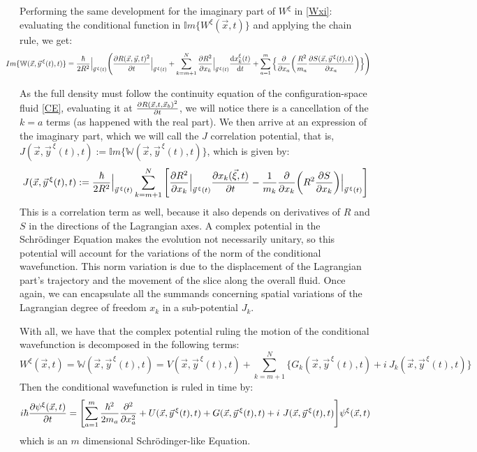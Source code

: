 \documentclass[11pt, a4paper]{article} %
\newcommand{\W}{\mathbb{W}}
\begin{document}
Performing the same development for the imaginary part of $W^\xi$ in \eqref{Wxi}: evaluating the conditional function in $\mathbb{I}m\{W^\xi(\vec{x},t)\}$ and applying the chain rule, we get:
\begin{equation}
\hspace{-0.7cm}Im\{\W(\vec{x}, \vec{y}^{\, \xi}(t),t)\}=\frac{\hbar}{2R^2}\Big\rvert_{\vec{y}^{\, \xi}(t)} \qty( \pdv{R(\vec{x},\vec{y},t)^2}{t}\Big\rvert_{\vec{y}^{\, \xi}(t)} + \sum_{k=m+1}^N \pdv{R^2}{x_k}\Big\rvert_{\vec{y}^{\, \xi}(t)} \dv{x_k^\xi(t)}{t} + \sum_{a=1}^m\Big\{\pdv{}{x_a} \qty(\frac{R^2}{m_a} \pdv{S(\vec{x}, \vec{y}^{\, \xi}(t),t)}{x_a} ) \Big\})
\end{equation}

As the full density must follow the continuity equation of the configuration-space fluid \eqref{CE}, evaluating it at $\pdv{R(\vec{x},t, \vec{x}_b)^2}{t}$, we will notice there is a cancellation of the $k=a$ terms (as happened with the real part). We then arrive at an expression of the imaginary part, which we will call the $J$ correlation potential, that is, $J(\vec{x}, \vec{y}^{\, \xi}(t),t):=\mathbb{I}m\{\W(\vec{x}, \vec{y}^{\, \xi}(t),t)\}$, which is given by:
\begin{equation}\label{J}
J(\vec{x}, \vec{y}^{\, \xi}(t),t):= \frac{\hbar}{2R^2}\Big\rvert_{\vec{y}^{\, \xi}(t)} \sum_{k=m+1}^N \qty[ \pdv{R^2}{x_k}\Big\rvert_{\vec{y}^{\, \xi}(t)} \pdv{x_k(\vec{\xi},t)}{t} - \frac{1}{m_k} \pdv{}{x_k} \qty(R^2 \pdv{S}{x_k} )\Big\rvert_{\vec{y}^{\, \xi}(t)} ]
\end{equation}
This is a correlation term as well, because it also depends on derivatives of $R$ and $S$ in the directions of the Lagrangian axes. A complex potential in the Schrödinger Equation makes the evolution not necessarily unitary, so this potential will account for the variations of the norm of the conditional wavefunction. This norm variation is due to the displacement of the Lagrangian part's trajectory and the movement of the slice along the overall fluid. Once again, we can encapsulate all the summands concerning spatial variations of the Lagrangian degree of freedom $x_k$ in a sub-potential $J_k$. 

With all, we have that the complex potential ruling the motion of the conditional wavefunction is decomposed in the following terms:
\begin{equation}
W^\xi(\vec{x},t)=\W(\vec{x}, \vec{y}^{\, \xi}(t),t)= V(\vec{x}, \vec{y}^{\, \xi}(t),t) + \sum_{k=m+1}^N\Big\{ G_k(\vec{x}, \vec{y}^{\, \xi}(t),t)+i\ J_k(\vec{x}, \vec{y}^{\, \xi}(t),t)\Big\}
\end{equation}
Then the conditional wavefunction is ruled in time by:
\begin{equation}\label{SE.GJ}
i \hbar \pdv{\psi^\xi (\vec{x},t)}{t} = \qty[\sum_{a=1}^m\frac{\hbar^2}{2m_a} \pdv[2]{}{x_a} +  U(\vec{x}, \vec{y}^{\, \xi}(t),t) + G(\vec{x}, \vec{y}^{\, \xi}(t),t)+i\ J(\vec{x}, \vec{y}^{\, \xi}(t),t)] \psi^\xi (\vec{x},t)
\end{equation}
which is an $m$ dimensional Schrödinger-like Equation.
\end{document}
